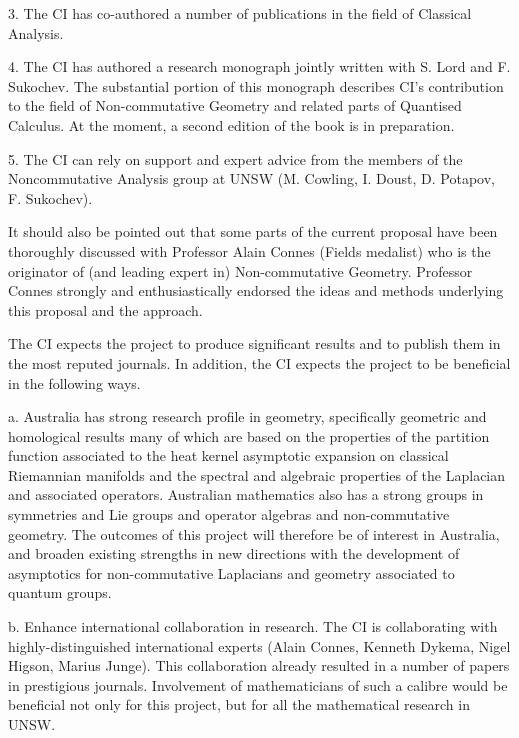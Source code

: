\documentclass[12pt]{article}
\newcommand{\archeading}[1]{\vspace{.3cm} \noindent{\bfseries #1} \vspace{.1cm}   }
\begin{document}
3. The CI has co-authored a number of publications in the field of Classical Analysis.

4. The CI has authored a research monograph \cite{book} jointly written with S. Lord and F. Sukochev. The substantial portion of this monograph describes CI's contribution to the field of Non-commutative Geometry and related parts of Quantised Calculus. At the moment, a second edition of the book is in preparation.

5. The CI can rely on support and expert advice from the members of the Noncommutative
Analysis group at UNSW (M. Cowling, I. Doust, D. Potapov, F. Sukochev).

It should also be pointed out that some parts of the current proposal have been thoroughly discussed with Professor Alain Connes (Fields medalist) who is the originator of (and leading expert in) Non-commutative Geometry. Professor Connes strongly and enthusiastically endorsed the ideas and methods underlying this proposal and the approach.



\bigskip\archeading{Benefit and collaboration}

The CI expects the project to produce significant results and to publish them in the most reputed journals. In addition, the CI expects the project to be beneficial in the following ways.

a. Australia has strong research profile in geometry, specifically geometric and homological results many of which are based on the properties of the partition function associated to the heat kernel asymptotic expansion on classical Riemannian manifolds and the spectral and algebraic properties of the Laplacian and associated operators. Australian mathematics also has a strong groups in symmetries and Lie groups and operator algebras and non-commutative geometry. The outcomes of this project will therefore be of interest in Australia, and broaden existing strengths in new directions with the development of asymptotics for non-commutative Laplacians and geometry associated to quantum groups.

b. Enhance international collaboration in research. The CI is collaborating with highly-distinguished international experts (Alain Connes, Kenneth Dykema, Nigel Higson, Marius Junge). This collaboration already resulted in a number of papers in prestigious journals. Involvement of mathematicians of such a calibre would be beneficial not only for this project, but for all the mathematical research in UNSW.
\end{document}
